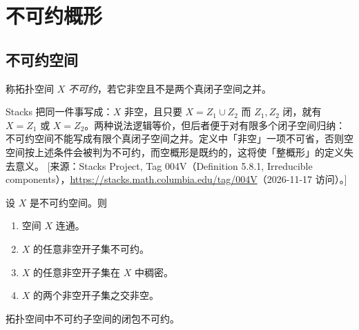 
\section{不可约概形}\label{sec:21}

\subsection{不可约空间}\label{sec:21.1}

\begin{definition}\label{def:21.1.1}
称拓扑空间 $X$ \emph{不可约}，若它非空且不是两个真闭子空间之并。
\end{definition}

\begin{yizhu}
Stacks 把同一件事写成：$X$ 非空，且只要 $X=Z_1\cup Z_2$ 而 $Z_1,Z_2$ 闭，就有 $X=Z_1$ 或 $X=Z_2$。两种说法逻辑等价，但后者便于对有限多个闭子空间归纳：不可约空间不能写成有限个真闭子空间之并。定义中「非空」一项不可省，否则空空间按上述条件会被判为不可约，而空概形是既约的，这将使「整概形」的定义失去意义。
[来源：Stacks Project, Tag 004V（Definition 5.8.1, Irreducible components），\url{https://stacks.math.columbia.edu/tag/004V}（2026-11-17 访问）。]
\end{yizhu}

\begin{exercise}\label{exc:21.1.2}
设 $X$ 是不可约空间。则
\begin{enumerate}[label=(\roman*),leftmargin=2em,itemsep=0.25ex]
  \item 空间 $X$ 连通。
  \item $X$ 的任意非空开子集不可约。
  \item $X$ 的任意非空开子集在 $X$ 中稠密。
  \item $X$ 的两个非空开子集之交非空。
\end{enumerate}
\end{exercise}

\begin{exercise}\label{exc:21.1.3}
拓扑空间中不可约子空间的闭包不可约。
\end{exercise}

